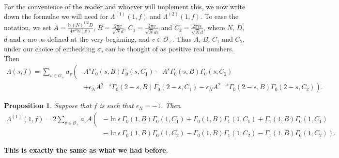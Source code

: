 \documentclass{article}
\theoremstyle{plain}
\newtheorem{proposition}{Proposition}
\begin{document}
For the convenience of the reader and whoever will implement this, we now write down the formulae we will need for $\Lambda^{(1)}(1,f)$ and $\Lambda^{(2)}(1,f)$.  To ease the notation, we set $A=\frac{\mathbb{N}(N)^{1/2}D}{4\pi^2\mathbb{N}(v)}$, $B=\frac{2\pi v }{\sqrt{N}d}$, $C_1=\frac{2 \pi \bar{v}}{\sqrt{\bar{N}}\bar{d} \epsilon}$ and $C_2=\frac{2 \pi \bar{v}\epsilon}{\sqrt{\bar{N}}\bar{d} }$, where $N$, $D$, $d$ and $\epsilon$ are as defined at the very beginning, and $v \in \mathcal{O}_+$. Thus $A$, $B$, $C_1$ and $C_2$, under our choice of embedding $\sigma$, can be thought of as positive real numbers. Then
\begin{equation}\label{simpleLambda}
\begin{split}
\Lambda(s,f)= \sum_{v \in \mathcal{O}_+} a_v \left( \right. &A^s \Gamma_0(s, B)\Gamma_0(s,C_1)  - A^s\Gamma_0(s,B)\Gamma_0(s,C_2)  \\
&+\left. \epsilon_N A^{2-s}\Gamma_0(2-s,B)\Gamma_0(2-s,C_1)-\epsilon_N A^{2-s}\Gamma_0(2-s,B)\Gamma_0(2-s,C_2) \right).
\end{split}
\end{equation}

\begin{proposition}
Suppose that $f$ is such that $\epsilon_N=-1$. Then
\begin{equation*}
\begin{split}
\Lambda^{(1)}(1,f)=  2 \sum_{v \in \mathcal{O}_+}  a_v A  \left( \right. & - \ln \epsilon \, \Gamma_0(1, B)\Gamma_0(1,C_1)+\Gamma_0(1,B)\Gamma_1(1,C_1)+\Gamma_1(1,B)\Gamma_0(1,C_1) \\
& - \left. \ln \epsilon \, \Gamma_0(1, B)\Gamma_0(1,C_2) - \Gamma_0(1,B)\Gamma_1(1,C_2) - \Gamma_1(1,B)\Gamma_0(1,C_2) \right).
\end{split}
\end{equation*}
\end{proposition}

\textbf{This is exactly the same as what we had before.}
\end{document}
